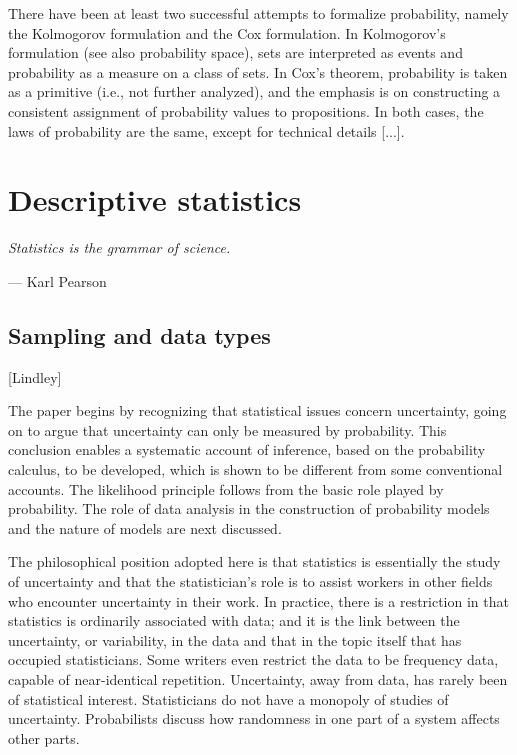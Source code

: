 \documentclass{book}
\begin{document}
\medskip

There have been at least two successful attempts to formalize probability, namely the Kolmogorov formulation and the Cox formulation. In Kolmogorov's formulation (see also probability space), sets are interpreted as events and probability as a measure on a class of sets. In Cox's theorem, probability is taken as a primitive (i.e., not further analyzed), and the emphasis is on constructing a consistent assignment of probability values to propositions. In both cases, the laws of probability are the same, except for technical details [...].\\



\chapter{Descriptive statistics}

\epigraph{\textit{Statistics is the grammar of science.}}{— Karl Pearson}

\section{Sampling and data types}
 
 [Lindley]
 
The paper begins by recognizing that statistical issues concern uncertainty, going on to argue that uncertainty can only be measured by probability. This conclusion enables a systematic account of inference, based on the probability calculus, to be developed, which is shown to be different from some conventional accounts. The likelihood principle follows from the basic role played by probability. The role of data analysis in the construction of probability models and the nature of models are next discussed.

\medskip

The philosophical position adopted here is that statistics is essentially the study of uncertainty and that the statistician's role is to assist workers in other fields who encounter uncertainty in their work. In practice, there is a restriction in that statistics is ordinarily associated with data; and it is the link between the uncertainty, or variability, in the data and that in the topic itself that has occupied statisticians. Some writers even restrict the data to be frequency data, capable of near-identical repetition. Uncertainty, away from data, has rarely been of statistical interest. Statisticians do not have a monopoly of studies of uncertainty. Probabilists discuss how randomness in one part of a system affects other parts.
\end{document}
